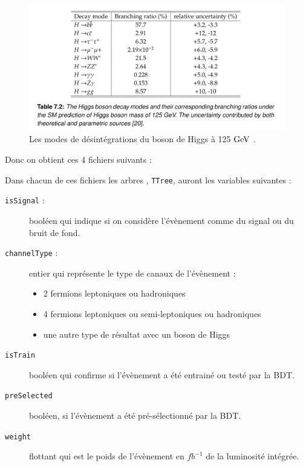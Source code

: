 \begin{figure}[h!]
	\centering
	\includegraphics[width=\textwidth]{../img/Higgs_decay_125GeV.png} 
	\caption{
		Les modes de désintégrations du boson de Higgs à 125 $\mathrm{GeV}$
		\cite{liu:tel-03405418}.
	}
\end{figure}

Donc on obtient ces 4 fichiers suivants :



Dans chacun de ces fichiers les arbres \ROOT, \texttt{TTree}, auront les variables suivantes :

\begin{description}

	\item[\texttt{isSignal} :] booléen qui indique si on considère l'évènement comme du signal ou du bruit de fond.
	
	\item[\texttt{channelType} :] entier qui représente le type de canaux de l'évènement \Figure{\ref{data:code}}:
	\begin{itemize}
		\item 2 fermions leptoniques ou hadroniques
		\item 4 fermions leptoniques ou semi-leptoniques ou hadroniques 
		\item une autre type de résultat avec un boson de Higgs
	\end{itemize}
	
	\item[\texttt{isTrain}] booléen qui confirme si l'évènement a été entrainé ou testé par la BDT.
	
	\item[\texttt{preSelected}] booléen, si l'évènement a été pré-sélectionné par la BDT.
	
	\item[\texttt{weight}] flottant qui est le poids de l'évènement en $fb^{-1}$ de la luminosité intégrée.
	
\end{description}


